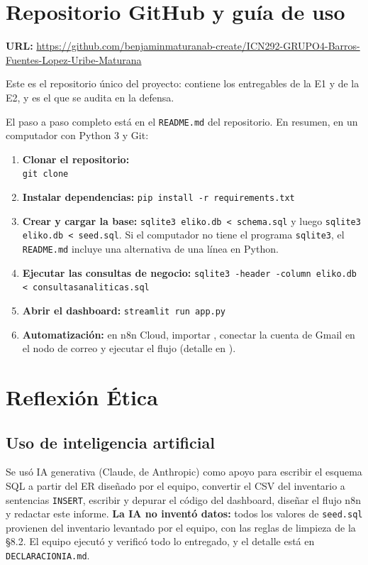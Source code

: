\documentclass[11pt,letterpaper]{article}
\renewcommand{\_}{\oldus\allowbreak}
\begin{document}
\section{Repositorio GitHub y guía de uso}
\textbf{URL:} \url{https://github.com/benjaminmaturanab-create/ICN292-GRUPO4-Barros-Fuentes-Lopez-Uribe-Maturana}

Este es el repositorio único del proyecto: contiene los entregables de la E1 y de la E2, y es el que se audita en la defensa.

El paso a paso completo está en el \texttt{README.md} del repositorio. En resumen, en un computador con Python 3 y Git:
\begin{enumerate}[leftmargin=1.6em]
\item \textbf{Clonar el repositorio:}\\ \texttt{git clone} 
\item \textbf{Instalar dependencias:} \texttt{pip install -r requirements.txt}
\item \textbf{Crear y cargar la base:} \texttt{sqlite3 eliko.db < schema.sql} y luego \texttt{sqlite3 eliko.db < seed.sql}. Si el computador no tiene el programa \texttt{sqlite3}, el \texttt{README.md} incluye una alternativa de una línea en Python.
\item \textbf{Ejecutar las consultas de negocio:} \texttt{sqlite3 -header -column eliko.db < consultas\_analiticas.sql}
\item \textbf{Abrir el dashboard:} \texttt{streamlit run app.py}
\item \textbf{Automatización:} en n8n Cloud, importar , conectar la cuenta de Gmail en el nodo de correo y ejecutar el flujo (detalle en ).
\end{enumerate}

\section{Reflexión Ética}
\subsection{Uso de inteligencia artificial}
Se usó IA generativa (Claude, de Anthropic) como apoyo para escribir el esquema SQL a partir del ER diseñado por el equipo, convertir el CSV del inventario a sentencias \texttt{INSERT}, escribir y depurar el código del dashboard, diseñar el flujo n8n y redactar este informe. \textbf{La IA no inventó datos:} todos los valores de \texttt{seed.sql} provienen del inventario levantado por el equipo, con las reglas de limpieza de la §8.2. El equipo ejecutó y verificó todo lo entregado, y el detalle está en \texttt{DECLARACION\_IA.md}.
\end{document}
